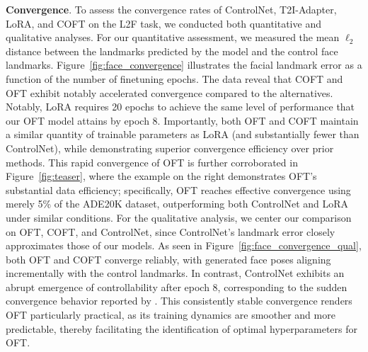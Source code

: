 {\textbf{Convergence}. To assess the convergence rates of ControlNet, T2I-Adapter, LoRA, and COFT on the L2F task, we conducted both quantitative and qualitative analyses. For our quantitative assessment, we measured the mean $\ell_2$ distance between the landmarks predicted by the model and the control face landmarks. Figure~\ref{fig:face_convergence} illustrates the facial landmark error as a function of the number of finetuning epochs. The data reveal that COFT and OFT exhibit notably accelerated convergence compared to the alternatives. Notably, LoRA requires 20 epochs to achieve the same level of performance that our OFT model attains by epoch 8. Importantly, both OFT and COFT maintain a similar quantity of trainable parameters as LoRA (and substantially fewer than ControlNet), while demonstrating superior convergence efficiency over prior methods. This rapid convergence of OFT is further corroborated in Figure~\ref{fig:teaser}, where the example on the right demonstrates OFT’s substantial data efficiency; specifically, OFT reaches effective convergence using merely 5\% of the ADE20K dataset, outperforming both ControlNet and LoRA under similar conditions. For the qualitative analysis, we center our comparison on OFT, COFT, and ControlNet, since ControlNet's landmark error closely approximates those of our models. As seen in Figure~\ref{fig:face_convergence_qual}, both OFT and COFT converge reliably, with generated face poses aligning incrementally with the control landmarks. In contrast, ControlNet exhibits an abrupt emergence of controllability after epoch 8, corresponding to the sudden convergence behavior reported by \cite{zhang2023adding}. This consistently stable convergence renders OFT particularly practical, as its training dynamics are smoother and more predictable, thereby facilitating the identification of optimal hyperparameters for OFT.

}
